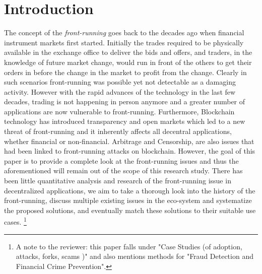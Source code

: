 \section{Introduction}



The concept of the \emph{front-running} goes back to the decades ago when financial instrument markets first started. Initially the trades required to be physically available in the exchange office to deliver the bids and offers, and traders, in the knowledge of future market change, would run in front of the others to get their orders in before the change in the market to profit from the change. Clearly in such scenarios front-running was possible yet not detectable as a damaging activity. However with the rapid advances of the technology in the last few decades, trading is not happening in person anymore and a greater number of applications are now vulnerable to front-running. Furthermore, Blockchain technology has introduced transparency and open markets which led to a new threat of front-running and it inherently affects all decentral applications, whether financial or non-financial. Arbitrage and Censorship, are also issues that had been linked to front-running attacks on blockchain. However, the goal of this paper is to provide a complete look at the front-running issues and thus the aforementioned will remain out of the scope of this research study. There has been little quantitative analysis and research of the front-running issue in decentralized applications, we aim to take a thorough look into the history of the front-running, discuss multiple existing issues in the eco-system and systematize the proposed solutions, and eventually match these solutions to their suitable use cases. \footnote{A note to the reviewer: this paper falls under "Case Studies (\eg of adoption, attacks, forks, scams \etc)" and also mentions methods for "Fraud Detection and Financial Crime Prevention". }




